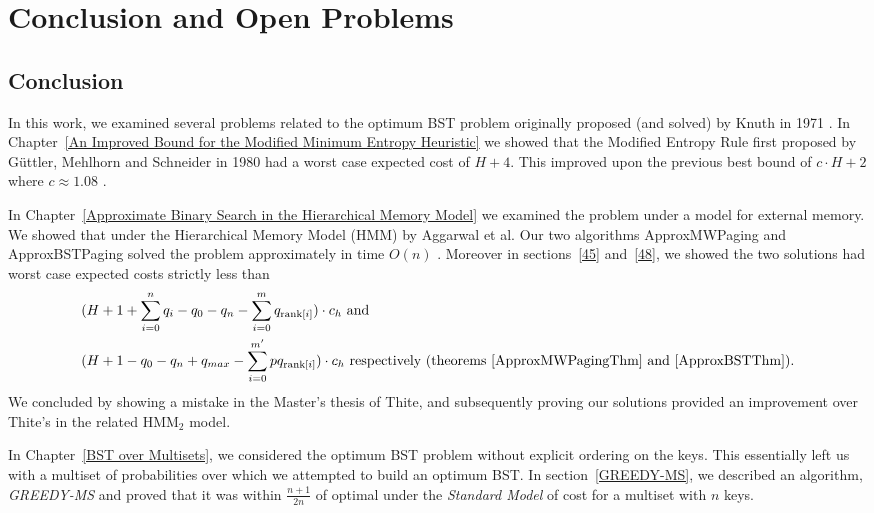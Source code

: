 \documentclass[letterpaper,12pt,titlepage,oneside,final]{book}
\theoremstyle{plain}
\begin{document}



\chapter{Conclusion and Open Problems} \label{Conclusion and Open Problems}

\section{Conclusion}

In this work, we examined several problems related to the optimum BST problem originally proposed (and solved) by Knuth in 1971 \cite{knuth1971optimum}. In Chapter~\ref{An Improved Bound for the Modified Minimum Entropy Heuristic} we showed that the Modified Entropy Rule first proposed by  G{\"u}ttler, Mehlhorn and Schneider in 1980 had a worst case expected cost of $H+4$. This improved upon the previous best bound of $c\cdot H+2$ where $c \approx 1.08$ \cite{guttler1980binary}.

In Chapter~\ref{Approximate Binary Search in the Hierarchical Memory Model} we examined the problem under a model for external memory. We showed that under the Hierarchical Memory Model (HMM) by Aggarwal et al. Our two algorithms ApproxMWPaging and ApproxBSTPaging solved the problem approximately in time $O(n)$ \cite{aggarwal1987model}. Moreover in sections~\ref{45} and~\ref{48}, we showed the two solutions had worst case expected costs strictly less than
\begin{align*}
&(H + 1 + \sum_{i=0}^n q_i - q_0 - q_n - \sum_{i=0}^m q_{\text{rank}[i]}) \cdot  c_h \text{ and} \\
&(H + 1 - q_0 - q_n + q_{max} - \sum_{i=0}^{m'} pq_{\text{rank}[i]})\cdot c_h \text{ respectively  (theorems~\ref{ApproxMWPagingThm} and~\ref{ApproxBSTThm})}.
\end{align*}
   We concluded by showing a mistake in the Master's thesis of Thite, and subsequently proving our solutions provided an improvement over Thite's in the related HMM$_2$ model.

In Chapter~\ref{BST over Multisets}, we considered the optimum BST problem without explicit ordering on the keys. This essentially left us with a multiset of probabilities over which we attempted to build an optimum BST. In section~\ref{GREEDY-MS}, we described an algorithm, \textit{GREEDY-MS} and proved that it was within $\frac{n+1}{2n}$ of optimal under the \textit{Standard Model} of cost for a multiset with $n$ keys.
\end{document}
